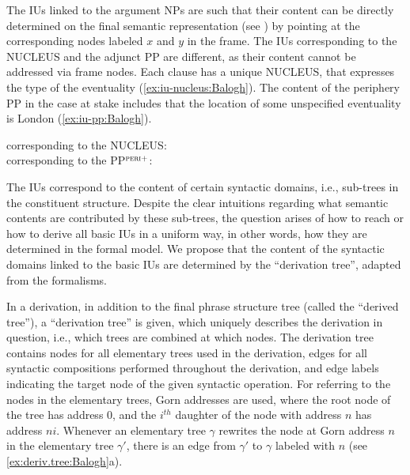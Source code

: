 \documentclass[output=paper,colorlinks,citecolor=brown]{langscibook}
\begin{document}
The IUs linked to the argument NPs are such that their content can be directly determined on the final semantic representation (see ) by pointing at the corresponding nodes labeled $x$ and $y$ in the frame. The IUs corresponding to the NUCLEUS and the adjunct PP are different, as their content cannot be addressed via frame nodes. Each clause has a unique NUCLEUS, that expresses the type of the eventuality (\ref{ex:iu-nucleus:Balogh}). The  content of the periphery PP in the case at stake includes that the location of some unspecified eventuality is London (\ref{ex:iu-pp:Balogh}). 

\ea
    \ea {} corresponding to the NUCLEUS: \label{ex:iu-nucleus:Balogh}\\[1mm]
    \ex {} corresponding to the PP$^{\textsc{peri+}}$: \label{ex:iu-pp:Balogh}\\[1mm]
    \z
\z

The IUs correspond to the content of certain syntactic domains, i.e., sub-trees in the constituent structure. Despite the clear intuitions regarding what semantic contents are contributed by these sub-trees, the question arises of how to reach or how to derive all basic IUs in a uniform way, in other words, how they are determined in the formal model. We propose that the content of the syntactic domains linked to the basic IUs are determined by the ``derivation tree'', adapted from the  formalisms. 

In a  derivation, in addition to the final phrase structure tree (called the ``derived tree''), a ``derivation tree'' is given, which uniquely describes the  derivation in question, i.e., which trees are combined at which nodes. The derivation tree contains nodes for all elementary trees used in the derivation, edges for all syntactic compositions performed throughout the derivation, and edge labels indicating the target node of the given syntactic operation. For referring to the nodes in the elementary trees, Gorn addresses \citep{gorn:67} are used, where the root node of the tree has address 0, and the $i^{th}$ daughter of the node with address $n$ has address $ni$. Whenever an elementary tree $\gamma$ rewrites the node at Gorn address $n$ in the elementary tree $\gamma'$, there is an edge from  $\gamma'$ to $\gamma$ labeled with $n$ (see \ref{ex:deriv.tree:Balogh}a).
\end{document}
